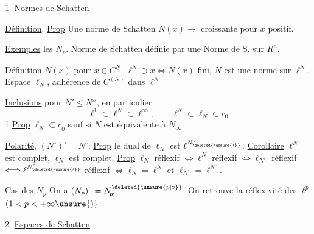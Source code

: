 

\textcircled{1} \uline{Normes de Schatten}

\uline{Définition}. \uline{Prop} Une norme de Schatten $N(x)\to$ croissante pour $x$ positif. 

\uline{Exemples} les $N_p$. Norme de Schatten définie par une Norme de S. sur $R^n$.

\uline{Définition} $N(x)$ pour $x\in\underline C^{\underline N}$. $\ell^N\ni x\Longleftrightarrow N(x)$ fini, $N$ est une norme sur $\ell^N$. Espace $\ell_N$, adhérence de $C^{(\underline N)}$ dans $\ell^N$

\uline{Inclusions} pour $N'\leq N''$, en particulier
\[
\ell^1\subset\ell^N\subset\ell^\infty,\qquad \ell^N\subset\ell_N\subset c_0
\]
1 \uline{Prop} $\ell_N\subset\underline c_0$ sauf si $N$ est équivalente à $N_\infty$

\uline{Polarité}, $(N^\circ)^\circ=N^\circ$; \uline{Prop} le dual de $\ell_N$ est $\ell^{N^{\circ}_{\deleted{\unsure{\prime}}}}$. \uline{Corollaire} $\ell^N$ est complet, $\ell_N$ est complet. \uline{Prop} $\ell_N$ réflexif $\Longleftrightarrow\ell^N$ réflexif $\Longleftrightarrow\ell_{N^\circ}$ réflexif $\Longleftrightarrow\ell^{N^{\circ}_{\deleted{\unsure{\prime}}}}$ réflexif $\Longleftrightarrow\ell_N=\ell^N$ et $\ell_{N^\circ}=\ell^{N^\circ}$.

 \uline{Cas des $N_p$} On a $(N_p)^\circ=N_{\!p'}^{\deleted{\unsure{p|\circ}}}$. On retrouve la réflexivité des $\ell^p$ $(1<p<+\infty\unsure{)}$

\textcircled{2} \uline{Espaces de Schatten}



